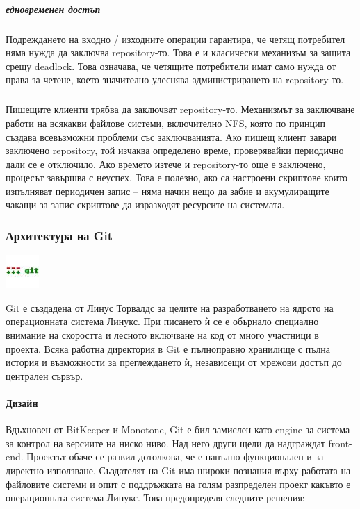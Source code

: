 \documentclass[a4paper]{article}
\begin{document}
      \subparagraph{едновременен достъп}
      Подреждането на входно / изходните операции гарантира, че четящ
      потребител няма нужда да заключва repository-то. Това е и класически
      механизъм за защита срещу deadlock. Това означава, че четящите
      потребители имат само нужда от права за четене, което значително улеснява
      администрирането на repository-то.

      \subparagraph{}
      Пишещите клиенти трябва да заключват repository-то. Механизмът за
      заключване работи на всякакви файлове системи, включително NFS\cite{nfs},
      която по принцип създава всевъзможни проблеми със заключванията. Ако пишещ клиент
      завари заключено repository, той изчаква определено време, проверявайки
      периодично дали се е отключило. Ако времето изтече и repository-то още
      е заключено, процесът завършва с неуспех. Това е полезно, ако са настроени
      скриптове които изпълняват периодичен запис -- няма начин нещо да забие
      и акумулиращите чакащи за запис скриптове да изразходят ресурсите на
      системата.

    \subsubsection{Архитектура на Git \cite{git-bottom-up}}
    \includegraphics[scale=1.0]{git_icon}


    Git е създадена от Линус Торвалдс за целите на разработването на ядрото на операционната система Линукс. При писането ѝ се е обърнало специално внимание на скоростта и лесното включване на код от много участници в проекта. Всяка работна директория в Git е пълноправно хранилище с пълна история и възможности за преглеждането ѝ, независещи от мрежови достъп до централен сървър.
  
    \paragraph{Дизайн}

    Вдъхновен от BitKeeper и Monotone, Git е бил замислен като engine за система за контрол на версиите на ниско ниво. Над него други щели да надграждат front-end. Проектът обаче се развил дотолкова, че е напълно функционален и за директно използване. Създателят на Git има широки познания върху работата на файловите системи и опит с поддръжката на голям разпределен проект какъвто е операционната система Линукс. Това предопределя следните решения:
\end{document}
